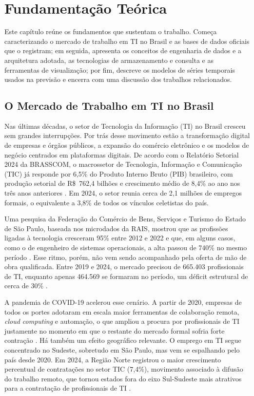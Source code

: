 
\chapter{Fundamentação Teórica}
\label{cap:referencial}

Este capítulo reúne os fundamentos que sustentam o trabalho. Começa caracterizando o mercado de trabalho em TI no Brasil e as bases de dados oficiais que o registram; em seguida, apresenta os conceitos de engenharia de dados e a arquitetura adotada, as tecnologias de armazenamento e consulta e as ferramentas de visualização; por fim, descreve os modelos de séries temporais usados na previsão e encerra com uma discussão dos trabalhos relacionados.

\section{O Mercado de Trabalho em TI no Brasil}

Nas últimas décadas, o setor de Tecnologia da Informação (TI) no Brasil cresceu sem grandes interrupções. Por trás desse movimento estão a transformação digital de empresas e órgãos públicos, a expansão do comércio eletrônico e os modelos de negócio centrados em plataformas digitais. De acordo com o Relatório Setorial 2024 da BRASSCOM, o macrossetor de Tecnologia, Informação e Comunicação (TIC) já responde por 6,5\% do Produto Interno Bruto (PIB) brasileiro, com produção setorial de R\$~762,4 bilhões e crescimento médio de 8,4\% ao ano nos três anos anteriores \cite{Brasscom2024}. Em 2024, o setor reunia cerca de 2,1 milhões de empregos formais, o equivalente a 3,8\% de todos os vínculos celetistas do país.

Uma pesquisa da Federação do Comércio de Bens, Serviços e Turismo do Estado de São Paulo, baseada nos microdados da RAIS, mostrou que as profissões ligadas à tecnologia cresceram 95\% entre 2012 e 2022 e que, em alguns casos, como o de engenheiro de sistemas operacionais, a alta passou de 740\% no mesmo período \cite{Fecomercio2024}. Esse ritmo, porém, não vem sendo acompanhado pela oferta de mão de obra qualificada. Entre 2019 e 2024, o mercado precisou de 665.403 profissionais de TI, enquanto apenas 464.569 se formaram no período, um déficit estrutural de cerca de 30\%
\cite{Brasscom2025}.

A pandemia de COVID-19 acelerou esse cenário. A partir de 2020, empresas de todos os portes adotaram em escala maior ferramentas de colaboração remota, \textit{cloud computing} e automação, o que ampliou a procura por profissionais de TI justamente no momento em que o restante do mercado formal sofria forte contração \cite{CAGED2024}. Há também um efeito geográfico relevante. O emprego em TI segue concentrado no Sudeste, sobretudo em São Paulo, mas vem se espalhando pelo país desde 2020. Em 2024, a Região Norte registrou o maior crescimento percentual de contratações no setor TIC (7,4\%), movimento associado à difusão do trabalho remoto, que tornou estados fora do eixo Sul-Sudeste mais atrativos para a contratação de profissionais de TI \cite{Brasscom2024}.

